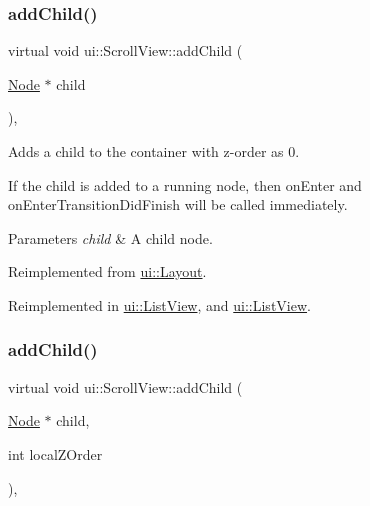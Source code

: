 \mbox{\label{classui_1_1ScrollView_a33a556579ca4e24b016a787af18cfcae}} 
\subsubsection{\texorpdfstring{add\+Child()}{addChild()}\hspace{0.1cm}{\footnotesize\ttfamily [5/8]}}
{\footnotesize\ttfamily virtual void ui\+::\+Scroll\+View\+::add\+Child (\begin{DoxyParamCaption}\item[{\hyperlink{classNode}{Node} $\ast$}]{child }\end{DoxyParamCaption})\hspace{0.3cm}{\ttfamily [override]}, {\ttfamily [virtual]}}

Adds a child to the container with z-\/order as 0.

If the child is added to a \textquotesingle{}running\textquotesingle{} node, then \textquotesingle{}on\+Enter\textquotesingle{} and \textquotesingle{}on\+Enter\+Transition\+Did\+Finish\textquotesingle{} will be called immediately.


\begin{DoxyParams}{Parameters}
{\em child} & A child node. \\
\hline
\end{DoxyParams}


Reimplemented from \hyperlink{classui_1_1Layout_a5d22ede0db71db1d5b597207f1c2013e}{ui\+::\+Layout}.



Reimplemented in \hyperlink{classui_1_1ListView_a7fb7f42f3f3ee9e9ca8ee3bb959e2c32}{ui\+::\+List\+View}, and \hyperlink{classui_1_1ListView_aeee2116f21f0e89de5a2e1b9cc93e012}{ui\+::\+List\+View}.

\mbox{\label{classui_1_1ScrollView_acfd1b4932c3926cf777ef00235c3386b}} 
\subsubsection{\texorpdfstring{add\+Child()}{addChild()}\hspace{0.1cm}{\footnotesize\ttfamily [6/8]}}
{\footnotesize\ttfamily virtual void ui\+::\+Scroll\+View\+::add\+Child (\begin{DoxyParamCaption}\item[{\hyperlink{classNode}{Node} $\ast$}]{child,  }\item[{int}]{local\+Z\+Order }\end{DoxyParamCaption})\hspace{0.3cm}{\ttfamily [override]}, {\ttfamily [virtual]}}

